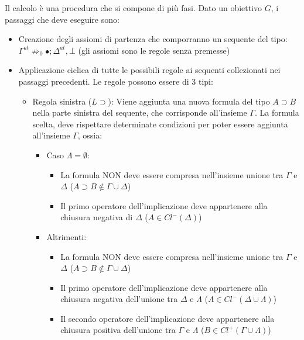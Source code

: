 \documentclass[\main/tesi.tex]{subfiles}
\begin{document}
Il calcolo è una procedura che si compone di più fasi. Dato un obiettivo $G$, i passaggi che deve eseguire sono:
\begin{itemize}
    \item Creazione degli assiomi di partenza che comporranno un sequente del tipo: $\Gamma^{at} \not\Rightarrow_0 \bullet; \Delta^{at}, \bot$ (gli assiomi sono le regole senza premesse)
    \item Applicazione ciclica di tutte le possibili regole ai sequenti collezionati nei passaggi precedenti. Le regole possono essere di 3 tipi:
          \begin{itemize}
              \item Regola sinistra ($L\supset$): Viene aggiunta una nuova formula del tipo $A \supset B$ nella parte sinistra del sequente, che corrisponde all'insieme $\Gamma$. La formula scelta, deve rispettare determinate condizioni per poter essere aggiunta all'insieme $\Gamma$, ossia:
                    \begin{itemize}
                        \item Caso $\Lambda = \emptyset$:
                              \begin{itemize}
                                  \item La formula NON deve essere compresa nell'insieme unione tra $\Gamma$ e $\Delta$ ($A \supset B \notin \Gamma \cup \Delta$)
                                  \item Il primo operatore dell'implicazione deve appartenere alla chiusura negativa di $\Delta$ ($A \in Cl^{-}(\Delta)$)
                              \end{itemize}
                        \item Altrimenti:
                              \begin{itemize}
                                  \item La formula NON deve essere compresa nell'insieme unione tra $\Gamma$ e $\Delta$ ($A \supset B \notin \Gamma \cup \Delta$)
                                  \item Il primo operatore dell'implicazione deve appartenere alla chiusura negativa dell'unione tra $\Delta$ e $\Lambda$ ($A \in Cl^{-}(\Delta \cup \Lambda)$)
                                  \item Il secondo operatore dell'implicazione deve appartenere alla chiusura positiva dell'unione tra $\Gamma$ e $\Lambda$ ($B \in Cl^{+}(\Gamma \cup \Lambda)$)
                              \end{itemize}

\end{itemize}
\end{itemize}
\end{itemize}
\end{document}
